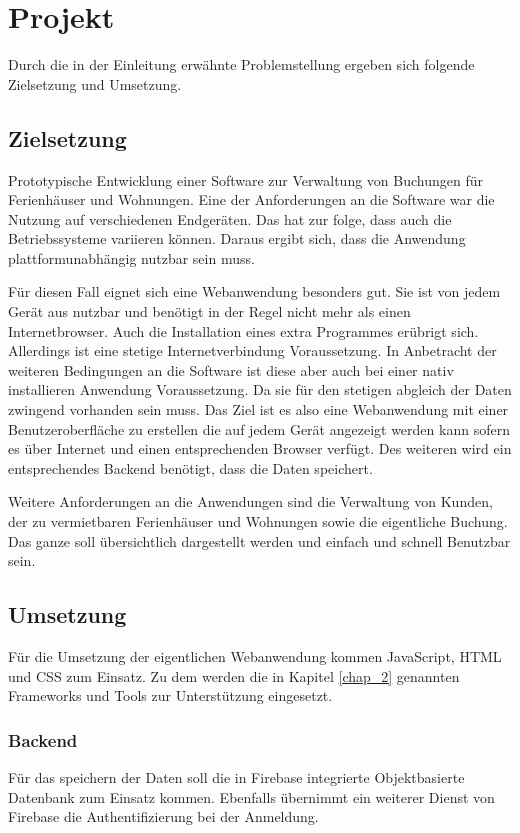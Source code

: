\chapter{Projekt}
Durch die in der Einleitung erwähnte Problemstellung ergeben sich folgende Zielsetzung und Umsetzung.
\section{Zielsetzung}
Prototypische Entwicklung einer Software zur Verwaltung von Buchungen für Ferienhäuser und Wohnungen. Eine der Anforderungen an die Software war die Nutzung auf verschiedenen Endgeräten. Das hat zur folge, dass auch die Betriebssysteme variieren können. Daraus ergibt sich, dass die Anwendung plattformunabhängig nutzbar sein muss. 

Für diesen Fall eignet sich eine Webanwendung besonders gut. Sie ist von jedem Gerät aus nutzbar und benötigt in der Regel nicht mehr als einen Internetbrowser. Auch die Installation eines extra Programmes erübrigt sich. Allerdings ist eine stetige Internetverbindung Voraussetzung. In Anbetracht der weiteren Bedingungen an die Software ist diese aber auch bei einer nativ installieren Anwendung Voraussetzung. Da sie für den stetigen abgleich der Daten zwingend vorhanden sein muss. Das Ziel ist es also eine Webanwendung mit einer Benutzeroberfläche zu erstellen die auf jedem Gerät angezeigt werden kann sofern es über Internet und einen entsprechenden Browser verfügt. Des weiteren wird ein entsprechendes Backend benötigt, dass die Daten speichert. 

Weitere Anforderungen an die Anwendungen sind die Verwaltung von Kunden, der zu vermietbaren Ferienhäuser und Wohnungen sowie die eigentliche Buchung. Das ganze soll übersichtlich dargestellt werden und einfach und schnell Benutzbar sein.


\section{Umsetzung}

Für die Umsetzung der eigentlichen Webanwendung kommen JavaScript, HTML und CSS zum Einsatz. Zu dem werden die in Kapitel \ref{chap_2} genannten Frameworks und Tools zur Unterstützung eingesetzt. 
\subsection{Backend}
Für das speichern der Daten soll die in Firebase integrierte Objektbasierte Datenbank zum Einsatz kommen. Ebenfalls übernimmt ein weiterer Dienst von Firebase die Authentifizierung bei der Anmeldung.

